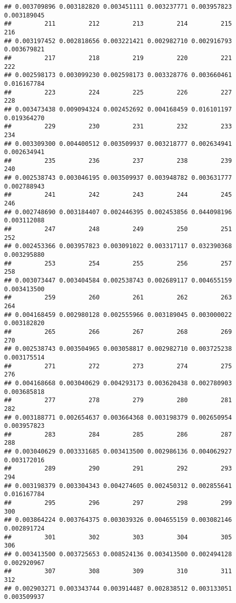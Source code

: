 \documentclass[
]{article}
\begin{document}
\begin{verbatim}
## 0.003709896 0.003182820 0.003451111 0.003237771 0.003957823 0.003189045 
##         211         212         213         214         215         216 
## 0.003197452 0.002818656 0.003221421 0.002982710 0.002916793 0.003679821 
##         217         218         219         220         221         222 
## 0.002598173 0.003099230 0.002598173 0.003328776 0.003660461 0.016167784 
##         223         224         225         226         227         228 
## 0.003473438 0.009094324 0.002452692 0.004168459 0.016101197 0.019364270 
##         229         230         231         232         233         234 
## 0.003309300 0.004400512 0.003509937 0.003218777 0.002634941 0.002634941 
##         235         236         237         238         239         240 
## 0.002538743 0.003046195 0.003509937 0.003948782 0.003631777 0.002788943 
##         241         242         243         244         245         246 
## 0.002748690 0.003184407 0.002446395 0.002453856 0.044098196 0.003112088 
##         247         248         249         250         251         252 
## 0.002453366 0.003957823 0.003091022 0.003317117 0.032390368 0.003295880 
##         253         254         255         256         257         258 
## 0.003073447 0.003404584 0.002538743 0.002689117 0.004655159 0.003413500 
##         259         260         261         262         263         264 
## 0.004168459 0.002980128 0.002555966 0.003189045 0.003000022 0.003182820 
##         265         266         267         268         269         270 
## 0.002538743 0.003504965 0.003058817 0.002982710 0.003725238 0.003175514 
##         271         272         273         274         275         276 
## 0.004168668 0.003040629 0.004293173 0.003620438 0.002780903 0.003685818 
##         277         278         279         280         281         282 
## 0.003188771 0.002654637 0.003664368 0.003198379 0.002650954 0.003957823 
##         283         284         285         286         287         288 
## 0.003040629 0.003331685 0.003413500 0.002986136 0.004062927 0.003172016 
##         289         290         291         292         293         294 
## 0.003198379 0.003304343 0.004274605 0.002450312 0.002855641 0.016167784 
##         295         296         297         298         299         300 
## 0.003864224 0.003764375 0.003039326 0.004655159 0.003082146 0.002891724 
##         301         302         303         304         305         306 
## 0.003413500 0.003725653 0.008524136 0.003413500 0.002494128 0.002920967 
##         307         308         309         310         311         312 
## 0.002903271 0.003343744 0.003914487 0.002838512 0.003133051 0.003509937 

\end{verbatim}
\end{document}
